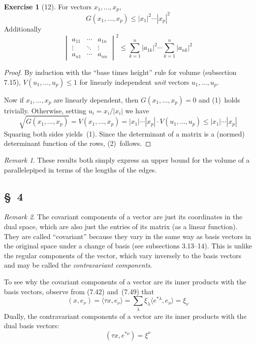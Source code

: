 \documentclass[letterpaper,12pt]{article}
\newcommand{\mult}{\cdot}
\newcommand{\sprod}[2]{\langle#1,#2\rangle}
\newcommand{\iprod}[2]{(#1,#2)}
\newcommand{\norm}[1]{|#1|}
\newcommand{\abs}[1]{|#1|}
\theoremstyle{definition}
\newtheorem*{exer}{Exercise}
\theoremstyle{remark}
\newtheorem*{rmk}{Remark}
\begin{document}
\begin{exer}[12]
For vectors \(x_1,\ldots,x_p\),
\[G(x_1,\ldots,x_p)\le\norm{x_1}^2\cdots\norm{x_p}^2\tag{1}\]
Additionally
\[\begin{vmatrix}
a_{11}&\cdots&a_{1n}\\
\vdots&\ddots&\vdots\\
a_{n1}&\cdots&a_{nn}
\end{vmatrix}^2\le\sum_{k=1}^n\abs{a_{1k}}^2\cdots\sum_{k=1}^n\abs{a_{nk}}^2\tag{2}\]
\end{exer}
\begin{proof}
By induction with the ``base times height'' rule for volume (subsection 7.15), \(V(u_1,\ldots,u_p)\le 1\) for linearly independent \emph{unit} vectors \(u_1,\ldots,u_p\).

Now if \(x_1,\ldots,x_p\) are linearly dependent, then \(G(x_1,\ldots,x_p)=0\) and (1)~holds trivially. Otherwise, setting \(u_i=x_i/\norm{x_i}\) we have
\[\sqrt{G(x_1,\ldots,x_p)}=V(x_1,\ldots,x_p)=\norm{x_1}\cdots\norm{x_p}\mult V(u_1,\ldots,u_p)\le\norm{x_1}\cdots\norm{x_p}\]
Squaring both sides yields~(1). Since the determinant of a matrix is a (normed) determinant function of the rows, (2)~follows.
\end{proof}
\begin{rmk}
These results both simply express an upper bound for the volume of a parallelepiped in terms of the lengths of the edges.
\end{rmk}

\subsection*{\S~4}
\begin{rmk}
The covariant components of a vector are just its coordinates in the dual space, which are also just the entries of its matrix (as a linear function). They are called ``covariant'' because they vary in the same way as basis vectors in the original space under a change of basis (see subsections 3.13--14). This is unlike the regular components of the vector, which vary inversely to the basis vectors and may be called the \emph{contravariant components}.

To see why the covariant components of a vector are its inner products with the basis vectors, observe from (7.42) and~(7.49) that
\[\iprod{x}{e_{\nu}}=\sprod{\tau x}{e_{\nu}}=\sum_{\lambda}\xi_{\lambda}\sprod{e^{*\lambda}}{e_{\nu}}=\xi_{\nu}\]
Dually, the contravariant components of a vector are its inner products with the dual basis vectors:
\[\iprod{\tau x}{e^{*\nu}}=\xi^{\nu}\]
\end{rmk}
\end{document}
